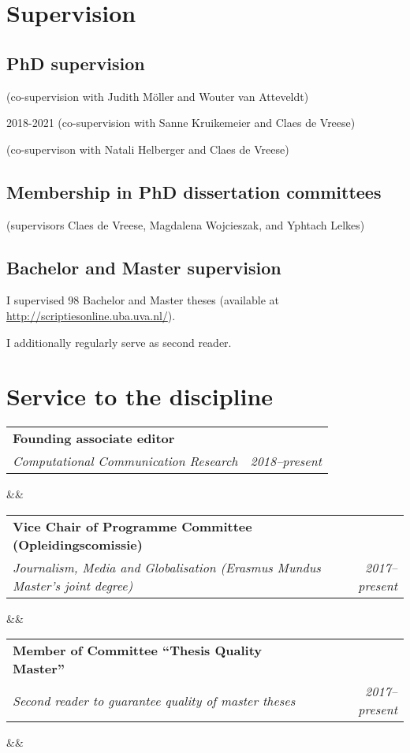 \documentclass[11pt,a4paper,sans]{moderncv}
\makeatletter
\renewcommand*{\cventry}[7][.25em]{
	\begin{tabular*}{\textwidth}{p{13cm}@{\extracolsep{\fill}}r}%
		{\bfseries #4} & {\bfseries #5} \\%
		{\itshape #3\ifthenelse{\equal{#6}{}}{}{, #6}} & {\itshape #2}\\%
	\end{tabular*}%
	\ifx&#7&%
	\else{\\\vbox{\small#7}}\fi%
        \par\addvspace{#1}}
\makeatother
\begin{document}
\section{Supervision}
\subsection{PhD supervision}
(co-supervision with Judith M\"oller and Wouter van Atteveldt) \newline

 {2018-2021}
(co-supervision with Sanne Kruikemeier and Claes de Vreese) \newline

(co-supervison with Natali Helberger and Claes de Vreese) \newline

\subsection{Membership in PhD dissertation committees}
(supervisors Claes de Vreese, Magdalena Wojcieszak, and Yphtach Lelkes) \newline

\subsection{Bachelor and Master supervision}
I supervised 98 Bachelor and Master theses (available at \url{http://scriptiesonline.uba.uva.nl/}). 

I additionally regularly serve as second reader.



\section{Service to the discipline}
\cventry{2018--present}{Computational Communication Research}{Founding associate editor}{}{}{}

\cventry{2017--present}{Journalism, Media and Globalisation (Erasmus Mundus Master's joint degree)}{Vice Chair of Programme Committee (Opleidingscomissie)}{}{}{}

\cventry{2017--present}{Second reader to guarantee quality of master theses}{Member of Committee ``Thesis Quality Master''}{}{}{}
\end{document}
